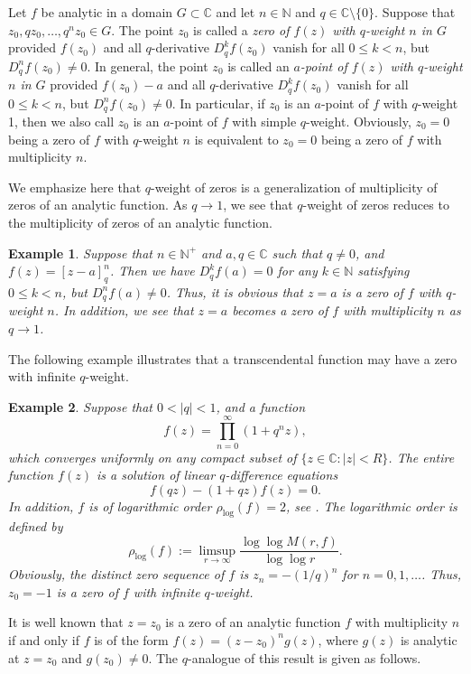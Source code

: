\documentclass[a4paper,12pt]{article}
\newcommand{\C}{\mathbb{C}}
\newcommand{\N}{\mathbb{N}}
\newtheorem{exa}{Example}[section]
\newenvironment{example}{\begin{exa}\rm}{\end{exa}}
\numberwithin{equation}{section}
\begin{document}
Let $f$ be analytic in a domain $G\subset\C$ and let $n\in\N$ and $q\in\C\setminus\{0\}$.
Suppose that $z_0, qz_0,\ldots, q^nz_0\in G$.
The point $z_0$ is called a \emph{zero of $f(z)$ with $q$-weight $n$ in $G$} provided $f(z_0)$ and all $q$-derivative $D_q^k f(z_0)$ vanish for all $0\leq k<n$, but $D_q^n f(z_0)\neq 0$. In general, the point $z_0$ is called an \emph{$a$-point of $f(z)$ with $q$-weight $n$ in $G$} provided $f(z_0)-a$ and all $q$-derivative $D_q^k f(z_0)$ vanish for all $0\leq k<n$, but $D_q^n f(z_0)\neq 0$.
In particular, if $z_0$ is an $a$-point of $f$ with $q$-weight 1, then we also call $z_0$ is an $a$-point of $f$ with simple $q$-weight. Obviously, $z_0=0$ being a zero of $f$ with $q$-weight $n$ is equivalent to $z_0=0$ being a zero of $f$ with multiplicity $n$.

We emphasize here that $q$-weight of zeros is a generalization of multiplicity of zeros of an analytic function. As $q\to 1$, we see that $q$-weight of zeros reduces to the multiplicity of zeros of an analytic function.

\begin{example}
Suppose that $n\in\N^+$ and $a, q\in\C$ such that $q\neq 0$, and $f(z)=[z-a]_q^n$. Then we have $D_q^kf(a)=0$ for any $k\in\N$ satisfying $0\leq k<n$, but $D_q^nf(a)\neq 0$. Thus, it is obvious that $z=a$ is a zero of $f$ with $q$-weight $n$. In addition, we see that $z=a$ becomes a zero of $f$ with multiplicity $n$ as $q\to 1$.
\end{example}

The following example  illustrates that a transcendental function may have a zero with infinite $q$-weight.

\begin{example}
Suppose that $0<|q|<1$, and a function
    $$
    f(z)=\prod_{n=0}^\infty(1+q^nz),
    $$
which converges uniformly on any compact subset of $\{z\in\C: |z|<R\}$. The entire function $f(z)$ is a solution of linear $q$-difference equations
    $$
    f(qz)-(1+qz)f(z)=0.
    $$
In addition, $f$ is of logarithmic order $\rho_{\log}(f)=2$, see \cite[Theorem~1.1]{Wen2014}.
 The logarithmic order is defined by
    $$
    \rho_{\log}(f):=\limsup_{r\to\infty}\frac{\log\log M(r,f)}{\log\log r}.
    $$
Obviously, the distinct zero sequence of $f$ is $z_n=-(1/q)^n$ for $n=0,1,\ldots$. Thus, $z_0=-1$ is a zero of $f$ with infinite $q$-weight.
\end{example}


It is well known that $z=z_0$ is a zero of an analytic function $f$ with multiplicity $n$ if
and only if $f$ is of the form $f(z)=(z-z_0)^ng(z)$, where $g(z)$ is analytic at $z = z_0$ and
$g(z_0)\neq 0$. The $q$-analogue of this result is given as follows.
\end{document}
